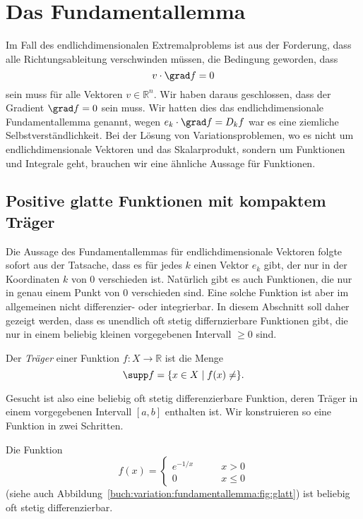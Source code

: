%
%
%
\section{Das Fundamentallemma
\label{buch:variation:section:fundamentallemma}}
Im Fall des endlichdimensionalen Extremalproblems ist aus der
Forderung, dass alle Richtungsableitung verschwinden müssen, 
die Bedingung geworden, dass
\[
v\cdot\grad f = 0
\]
sein muss für alle Vektoren $v\in\mathbb{R}^n$.
Wir haben daraus geschlossen, dass der Gradient $\grad f=0$
sein muss.
Wir hatten dies das endlichdimensionale Fundamentallemma genannt,
wegen $e_k\cdot \grad f = D_kf$ war es eine ziemliche Selbstverständlichkeit.
Bei der Lösung von Variationsproblemen, wo es nicht um endlichdimensionale
Vektoren und das Skalarprodukt, sondern um Funktionen und Integrale
geht, brauchen wir eine ähnliche Aussage für Funktionen.

%
%
\subsection{Positive glatte Funktionen mit kompaktem Träger}
Die Aussage des Fundamentallemmas für endlichdimensionale Vektoren 
folgte sofort aus der Tatsache, dass es für jedes $k$ einen Vektor
$e_k$ gibt, der nur in der Koordinaten $k$ von $0$ verschieden ist.
Natürlich gibt es auch Funktionen, die nur in genau einem Punkt
von $0$ verschieden sind.
Eine solche Funktion ist aber im allgemeinen nicht differenzier-
oder integrierbar.
In diesem Abschnitt soll daher gezeigt werden, dass es unendlich
oft stetig differnzierbare Funktionen gibt, die nur in einem beliebig
kleinen vorgegebenen Intervall $\ge 0$ sind.

\begin{definition}[Träger]
Der {\em Träger} einer Funktion $f\colon X\to\mathbb{R}$ ist die Menge
%
\[
\supp f = \{ x\in X\mid f(x)\ne \}.
\]
\end{definition}

Gesucht ist also eine beliebig oft stetig differenzierbare Funktion,
deren Träger in einem vorgegebenen Intervall $[a,b]$ enthalten ist.
Wir konstruieren so eine Funktion in zwei Schritten.



\begin{satz}
\label{buch:variation:fundamentallemma:satz:glatt}
Die Funktion
\[
f(x)
=
\begin{cases}
e^{-1/x}&\qquad x>0\\
0&\qquad x\le 0
\end{cases}
\]
(siehe auch Abbildung~\ref{buch:variation:fundamentallemma:fig:glatt})
ist beliebig oft stetig differenzierbar.
\end{satz}

